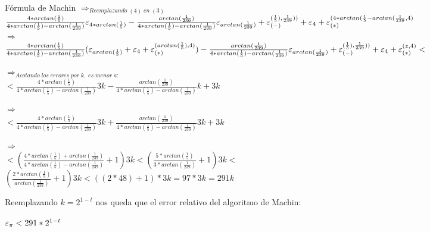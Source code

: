 \begin{section}{Fórmula de Machin}
	$\Rightarrow_{Reemplazando \; (4) \; en \; (3)}$\\
	
	$\frac{4*arctan(\frac{1}{5})}{4*arctan(\frac{1}{5})-arctan(\frac{1}{239})}\varepsilon _{4*arctan(\frac{1}{5})} - \frac{arctan(\frac{1}{239})}{4*arctan(\frac{1}{5})-arctan(\frac{1}{239})}\varepsilon _{arctan(\frac{1}{239})} + \varepsilon _{({-})}^{({\frac{1}{5}),\frac{1}{239})})} + \varepsilon _{4} + \varepsilon _{({*})}^{({4*arctan(\frac{1}{5}-arctan(\frac{1}{239},4})}$\\
	
	$\Rightarrow$\\
	
	$\frac{4*arctan(\frac{1}{5})}{4*arctan(\frac{1}{5})-arctan(\frac{1}{239})}(\varepsilon _{arctan(\frac{1}{5})}+\varepsilon _{4}+\varepsilon _{({*})}^{({arctan(\frac{1}{5}),4})}) - \frac{arctan(\frac{1}{239})}{4*arctan(\frac{1}{5})-arctan(\frac{1}{239})}\varepsilon _{arctan(\frac{1}{239})} + \varepsilon _{({-})}^{({\frac{1}{5}),\frac{1}{239})})} + \varepsilon _{4} + \varepsilon _{({*})}^{({z,4})} < $
	
	$\Rightarrow_{Acotando \; los \; errores \; por \; k, \; es \; menor \; a:}$\\
	
	$< \frac{4*arctan(\frac{1}{5})}{4*arctan(\frac{1}{5})-arctan(\frac{1}{239})}3k - \frac{arctan(\frac{1}{239})}{4*arctan(\frac{1}{5})-arctan(\frac{1}{239})}k+3k $
	
	$\Rightarrow$\\
	
	$< \frac{4*arctan(\frac{1}{5})}{4*arctan(\frac{1}{5})-arctan(\frac{1}{239})}3k + \frac{arctan(\frac{1}{239})}{4*arctan(\frac{1}{5})-arctan(\frac{1}{239})}3k+3k $
	
	$\Rightarrow$\\
	
	$< (\frac{4*arctan(\frac{1}{5})+arctan(\frac{1}{239})}{4*arctan(\frac{1}{5})-arctan(\frac{1}{239})} + 1) 3k <  (\frac{5*arctan(\frac{1}{5})}{3*arctan(\frac{1}{239})} + 1)3k < $\\
	
	$(\frac{2*arctan(\frac{1}{5})}{arctan(\frac{1}{239})} + 1)3k < ((2*48) + 1)*3k = 97*3k = 291k$
	
	Reemplazando $k=2^{1-t}$ nos queda que el error relativo del algoritmo de Machin:
	
		$\varepsilon _{\pi} < 291*2^{1-t}$
	
	
\end{section}
